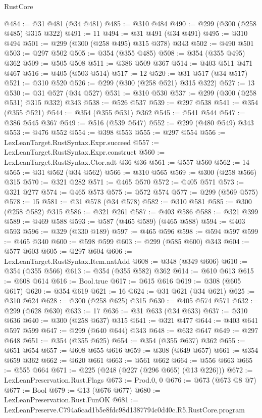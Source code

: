 \begin{lexlean}{RustCore}
\begin{coremodule}
@484 := @31 @481 (@34 @481)
@485 := @310 @484
@490 := @299 (@300 (@258 @485) @315 @322)
@491 := 11
@494 := @31 @491 (@34 @491)
@495 := @310 @494
@501 := @299 (@300 (@258 @495) @315 @378) @343
@502 := @490 @501
@503 := @297 @502
@505 := @354 (@355 @485)
@508 := @354 (@355 @495) @362
@509 := @505 @508
@511 := @386 @509 @367
@514 := @403 @511 @471 @467
@516 := @405 (@503 @514)
@517 := 12
@520 := @31 @517 (@34 @517)
@521 := @310 @520
@526 := @299 (@300 (@258 @521) @315 @322)
@527 := 13
@530 := @31 @527 (@34 @527)
@531 := @310 @530
@537 := @299 (@300 (@258 @531) @315 @332) @343
@538 := @526 @537
@539 := @297 @538
@541 := @354 (@355 @521)
@544 := @354 (@355 @531) @362
@545 := @541 @544
@547 := @386 @545 @367
@549 := @516 (@539 @547)
@552 := @299 (@480 @549) @343
@553 := @476 @552
@554 := @398 @553
@555 := @297 @554
@556 := LexLeanTarget.RustSyntax.Expr.succeed
@557 := LexLeanTarget.RustSyntax.Expr.construct
@560 := LexLeanTarget.RustSyntax.Ctor.adt @36 @36
@561 := @557 @560
@562 := 14
@565 := @31 @562 (@34 @562)
@566 := @310 @565
@569 := @300 (@258 @566) @315
@570 := @321 @282
@571 := @465 @570
@572 := @405 @571
@573 := @321 @277
@574 := @465 @573
@575 := @572 @574
@577 := @299 (@569 @575)
@578 := 15
@581 := @31 @578 (@34 @578)
@582 := @310 @581
@585 := @300 (@258 @582) @315
@586 := @321 @261
@587 := @403 @586
@588 := @321 @399
@589 := @469 @588
@593 := @587 (@465 @589) (@465 @588)
@594 := @403 @593
@596 := @329 (@330 @189)
@597 := @465 @596
@598 := @594 @597
@599 := @465 @340
@600 := @598 @599
@603 := @299 (@585 @600) @343
@604 := @577 @603
@605 := @297 @604
@606 := LexLeanTarget.RustSyntax.Item.natAdd
@608 := @348 (@349 @606)
@610 := @354 (@355 @566)
@613 := @354 (@355 @582) @362
@614 := @610 @613
@615 := @608 @614
@616 := Bool.true
@617 := @615 @616
@619 := @308 (@605 @617)
@620 := @354 @619
@621 := 16
@624 := @31 @621 (@34 @621)
@625 := @310 @624
@628 := @300 (@258 @625) @315
@630 := @405 @574 @571
@632 := @299 (@628 @630)
@633 := 17
@636 := @31 @633 (@34 @633)
@637 := @310 @636
@640 := @300 (@258 @637) @315
@641 := @321 @477
@644 := @403 @641 @597 @599
@647 := @299 (@640 @644) @343
@648 := @632 @647
@649 := @297 @648
@651 := @354 (@355 @625)
@654 := @354 (@355 @637) @362
@655 := @651 @654
@657 := @608 @655 @616
@659 := @308 (@649 @657)
@661 := @354 @659 @362
@662 := @620 @661
@663 := @561 @662
@664 := @556 @663
@665 := @555 @664
@671 := @225 (@248 (@227 (@296 @665) (@13 @226)))
@672 := LexLeanPreservation.Rust.Flags
@673 := Prod.{0, 0}
@676 := @673 (@673 @8 @7)
@677 := Bool
@679 := @13 (@676 @677)
@680 := LexLeanPreservation.Rust.FunOK
@681 := LexLeanPreserve.C794a6cad1b5e8fdc98d1387794c0d40c.R5.RustCore.program

\end{coremodule}
\end{lexlean}
